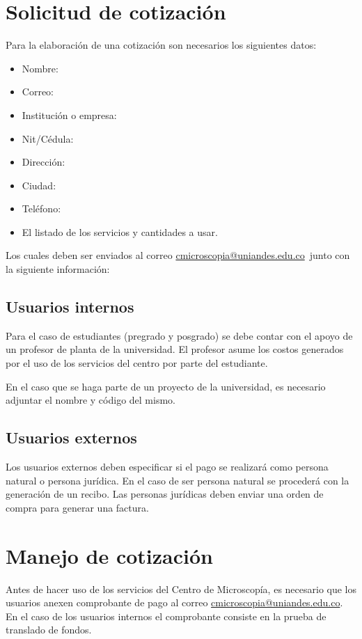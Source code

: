 \documentclass[11pt, letter-size]{article}
\makeatletter
\newcommand{\centro}{Centro de Microscop\'ia}
\newcommand{\correo}{\url{cmicroscopia@uniandes.edu.co}}
\makeatother
\begin{document}
	\section{Solicitud de cotizaci\'on}
	Para la elaboraci\'on de una cotizaci\'on son necesarios los siguientes datos:
		\begin{itemize}
			\item Nombre:
			\item Correo:
			\item Instituci\'on o empresa:
			\item Nit/C\'edula:
			\item Direcci\'on:
			\item Ciudad:
			\item Tel\'efono:
			\item El listado de los servicios y cantidades a usar. 
		\end{itemize}
	Los cuales deben ser enviados al correo \correo\ junto con la siguiente informaci\'on:
	
	\subsection{Usuarios internos}
	Para el caso de estudiantes (pregrado y posgrado) se debe contar con el apoyo de un profesor de planta de la universidad. El profesor asume los costos generados por el uso de los servicios del centro por parte del estudiante.
	
	En el caso que se haga parte de un proyecto de la universidad, es necesario adjuntar el nombre y c\'odigo del mismo.
	\subsection{Usuarios externos}
	Los usuarios externos deben especificar si el pago se realizar\'a como persona natural o persona jur\'idica. En el caso de ser persona natural se proceder\'a con la generaci\'on de un recibo. Las personas jur\'idicas deben enviar una orden de compra para generar una factura.
	
	\section{Manejo de cotizaci\'on}
	Antes de hacer uso de los servicios del \centro, es necesario que los usuarios anexen comprobante de pago al correo \correo. En el caso de los usuarios internos el comprobante consiste en la prueba de translado de fondos.
	
\end{document}
